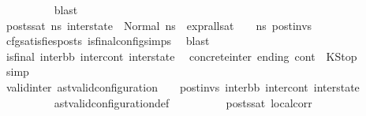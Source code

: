 \begin{isabellebody}
\ \ \ \ \ \ \ \ \isamarkupfalse%
\ blast\isanewline
\ \ \ \ \ \ \isamarkupfalse%
\ posts{\isacharunderscore}{\kern0pt}sat{\isacharcolon}{\kern0pt}\ {\isachardoublequoteopen}{\isasymforall}ns{}{\isacharprime}{\kern0pt}{\isachardot}{\kern0pt}\ inter{\isacharunderscore}{\kern0pt}state\ {\isacharequal}{\kern0pt}\ Normal\ ns{}{\isacharprime}{\kern0pt}\ {\isasymlongrightarrow}\ {\isacharparenleft}{\kern0pt}expr{\isacharunderscore}{\kern0pt}all{\isacharunderscore}{\kern0pt}sat\ {\isasymLambda}\ {\isasymGamma}\ {\isasymOmega}\ ns{}{\isacharprime}{\kern0pt}{\isacharparenright}{\kern0pt}\ post{\isacharunderscore}{\kern0pt}invs{\isachardoublequoteclose}\ \isanewline
\ \ \ \ \ \ \ \ \isamarkupfalse%
\ cfg{\isacharunderscore}{\kern0pt}satisfies{\isacharunderscore}{\kern0pt}posts\ is{\isacharunderscore}{\kern0pt}final{\isacharunderscore}{\kern0pt}config{\isachardot}{\kern0pt}simps{\isacharparenleft}{\kern0pt}{}{\isacharparenright}{\kern0pt}\ \isamarkupfalse%
\ blast\isanewline
\isanewline
\ \ \ \ \ \ \isamarkupfalse%
\ {\isachardoublequoteopen}is{\isacharunderscore}{\kern0pt}final\ {\isacharparenleft}{\kern0pt}inter{\isacharunderscore}{\kern0pt}bb{\isacharcomma}{\kern0pt}\ inter{\isacharunderscore}{\kern0pt}cont{\isacharcomma}{\kern0pt}\ inter{\isacharunderscore}{\kern0pt}state{\isacharparenright}{\kern0pt}{\isachardoublequoteclose}\ \isamarkupfalse%
\ concrete{\isacharunderscore}{\kern0pt}inter\ ending\ {\isacartoucheopen}cont{}\ {\isacharequal}{\kern0pt}\ KStop{\isacartoucheclose}\ \isamarkupfalse%
\ simp\ \isanewline
\isanewline
\ \ \ \ \ \ \isamarkupfalse%
\ valid{\isacharunderscore}{\kern0pt}inter{\isacharcolon}{\kern0pt}\ {\isachardoublequoteopen}{\isacharparenleft}{\kern0pt}ast{\isacharunderscore}{\kern0pt}valid{\isacharunderscore}{\kern0pt}configuration\ {\isasymLambda}\ {\isasymGamma}\ {\isasymOmega}\ post{\isacharunderscore}{\kern0pt}invs\ inter{\isacharunderscore}{\kern0pt}bb\ inter{\isacharunderscore}{\kern0pt}cont\ inter{\isacharunderscore}{\kern0pt}state{\isacharparenright}{\kern0pt}{\isachardoublequoteclose}\ \isanewline
\ \ \ \ \ \ \ \ \isamarkupfalse%
\ ast{\isacharunderscore}{\kern0pt}valid{\isacharunderscore}{\kern0pt}configuration{\isacharunderscore}{\kern0pt}def\isanewline
\ \ \ \ \ \ \ \ \isamarkupfalse%
\ posts{\isacharunderscore}{\kern0pt}sat\ local{\isacharunderscore}{\kern0pt}corr\ \isamarkupfalse%

\end{isabellebody}
